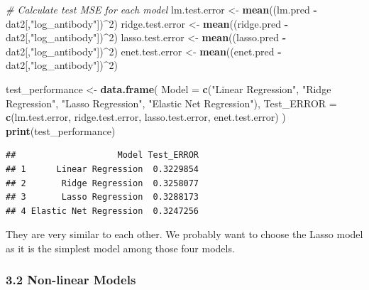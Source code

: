 \documentclass[
]{article}
\newenvironment{Shaded}{\begin{snugshade}}{\end{snugshade}}
\newcommand{\AttributeTok}[1]{\textcolor[rgb]{0.13,0.29,0.53}{#1}}
\newcommand{\CommentTok}[1]{\textcolor[rgb]{0.56,0.35,0.01}{\textit{#1}}}
\newcommand{\DecValTok}[1]{\textcolor[rgb]{0.00,0.00,0.81}{#1}}
\newcommand{\FunctionTok}[1]{\textcolor[rgb]{0.13,0.29,0.53}{\textbf{#1}}}
\newcommand{\NormalTok}[1]{#1}
\newcommand{\OtherTok}[1]{\textcolor[rgb]{0.56,0.35,0.01}{#1}}
\newcommand{\SpecialCharTok}[1]{\textcolor[rgb]{0.81,0.36,0.00}{\textbf{#1}}}
\newcommand{\StringTok}[1]{\textcolor[rgb]{0.31,0.60,0.02}{#1}}
\begin{document}
\begin{Shaded}
\begin{Highlighting}[]
\CommentTok{\# Calculate test MSE for each model}
\NormalTok{lm.test.error }\OtherTok{\textless{}{-}} \FunctionTok{mean}\NormalTok{((lm.pred }\SpecialCharTok{{-}}\NormalTok{ dat2[,}\StringTok{"log\_antibody"}\NormalTok{])}\SpecialCharTok{\^{}}\DecValTok{2}\NormalTok{)}
\NormalTok{ridge.test.error }\OtherTok{\textless{}{-}} \FunctionTok{mean}\NormalTok{((ridge.pred }\SpecialCharTok{{-}}\NormalTok{ dat2[,}\StringTok{"log\_antibody"}\NormalTok{])}\SpecialCharTok{\^{}}\DecValTok{2}\NormalTok{)}
\NormalTok{lasso.test.error }\OtherTok{\textless{}{-}} \FunctionTok{mean}\NormalTok{((lasso.pred }\SpecialCharTok{{-}}\NormalTok{ dat2[,}\StringTok{"log\_antibody"}\NormalTok{])}\SpecialCharTok{\^{}}\DecValTok{2}\NormalTok{)}
\NormalTok{enet.test.error }\OtherTok{\textless{}{-}} \FunctionTok{mean}\NormalTok{((enet.pred }\SpecialCharTok{{-}}\NormalTok{ dat2[,}\StringTok{"log\_antibody"}\NormalTok{])}\SpecialCharTok{\^{}}\DecValTok{2}\NormalTok{)}
\end{Highlighting}
\end{Shaded}

\begin{Shaded}
\begin{Highlighting}[]
\NormalTok{test\_performance }\OtherTok{\textless{}{-}} \FunctionTok{data.frame}\NormalTok{(}
  \AttributeTok{Model =} \FunctionTok{c}\NormalTok{(}\StringTok{"Linear Regression"}\NormalTok{, }\StringTok{"Ridge Regression"}\NormalTok{, }\StringTok{"Lasso Regression"}\NormalTok{, }
            \StringTok{"Elastic Net Regression"}\NormalTok{),}
  \AttributeTok{Test\_ERROR =} \FunctionTok{c}\NormalTok{(lm.test.error, ridge.test.error, lasso.test.error, }
\NormalTok{                enet.test.error)}
\NormalTok{)}
\FunctionTok{print}\NormalTok{(test\_performance)}
\end{Highlighting}
\end{Shaded}

\begin{verbatim}
##                    Model Test_ERROR
## 1      Linear Regression  0.3229854
## 2       Ridge Regression  0.3258077
## 3       Lasso Regression  0.3288173
## 4 Elastic Net Regression  0.3247256
\end{verbatim}

They are very similar to each other. We probably want to choose the
Lasso model as it is the simplest model among those four models.

\subsubsection{3.2 Non-linear Models}\label{non-linear-models}
\end{document}
